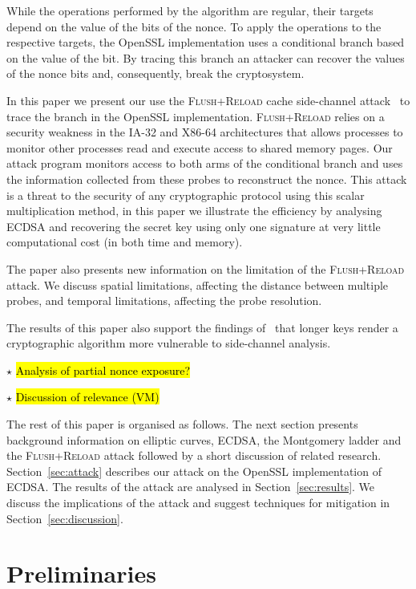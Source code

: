 \documentclass{llncs}
\newcommand{\starpar}[1]{\par{\footnotesize $\star$ \hl{#1}\par}}
\begin{document}
While the operations performed by the algorithm are regular, their targets depend on the value of the bits of the nonce.
To apply the operations to the respective targets, the OpenSSL implementation uses a conditional branch based on the value of the bit.
By tracing this branch an attacker can recover the values of the nonce bits and, consequently, break the cryptosystem.

In this paper we present our use the \textsc{Flush+Reload} cache side-channel attack~\cite{yarom13flush}
to trace the branch in the OpenSSL implementation.
\textsc{Flush+Reload} relies on a security weakness in the IA-32 and X86-64 architectures that allows processes
to monitor other processes read and execute access to shared memory pages.
Our attack program monitors access to both arms of the conditional branch and uses the information
collected from these probes to reconstruct the nonce. This attack is a threat to the security of any cryptographic protocol using this scalar multiplication method, in this paper we illustrate the efficiency by analysing ECDSA and recovering the secret key using only one signature at very little computational cost (in both time and memory).

The paper also presents new information on the limitation of the \textsc{Flush+Reload} attack.
We discuss spatial limitations, affecting the distance between multiple probes, and 
temporal limitations, affecting the probe resolution.

The results of this paper also support the findings of~\cite{walter04longer} that longer keys render a cryptographic algorithm more vulnerable to side-channel analysis.

\starpar{Analysis of partial nonce exposure?}
\starpar{Discussion of relevance (VM)}

The rest of this paper is organised as follows. The next section presents background information on elliptic curves, ECDSA, the Montgomery ladder and the \textsc{Flush+Reload} attack followed by a short discussion of related research.
Section~\ref{sec:attack} describes our attack on the OpenSSL implementation of ECDSA.
The results of the attack are analysed in Section~\ref{sec:results}.
We discuss the implications of the attack and suggest techniques for mitigation in Section~\ref{sec:discussion}.

\section{Preliminaries}\label{sec:background}
\end{document}
